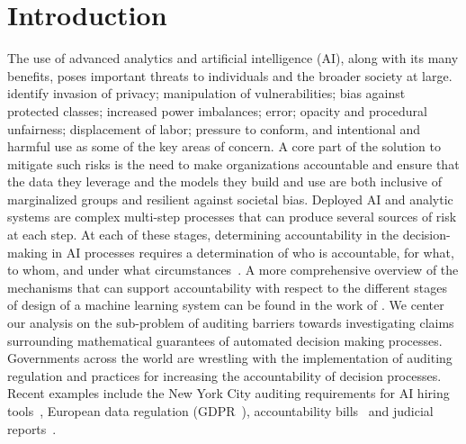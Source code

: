\section{Introduction}



The use of advanced analytics and artificial intelligence (AI), along with its many benefits, poses important threats to individuals and the broader society at large.
\cite{hirsch20corporate} identify invasion of privacy; manipulation of vulnerabilities;  bias against protected classes; increased power imbalances;  error; opacity and procedural unfairness; displacement of labor;  pressure to conform, and intentional and harmful use as some of the key areas of concern.
A core part of the solution %
to mitigate such risks is the need to make organizations accountable and ensure that the data they leverage and the models they build and use 
are both inclusive of marginalized groups and resilient against societal bias.
Deployed AI and analytic systems are complex multi-step processes that can produce several sources of risk at each step.
At each of these stages, determining accountability in the decision-making in AI processes requires a determination of who is accountable, for what, to whom, and under what circumstances~\citep{nissenbaum1996accountability,cooper2022accountability}. 
A more comprehensive overview of the mechanisms that can support accountability with respect to the different stages of design of a machine learning system can be found in the work of \citet{cooper2022accountability}.
We center our analysis on the sub-problem of auditing barriers towards investigating claims surrounding mathematical guarantees of automated decision making processes.
Governments across the world are wrestling with the implementation of auditing regulation and practices for increasing the accountability of decision processes.
Recent examples include the New York City auditing requirements for AI hiring tools~\citep{vanderford2022nybiaslaw}, European data regulation (GDPR~\citeyear{GDPR}), accountability bills~\citeyear{congress2019hr,algtransparency2022} and judicial reports~\citeyear{justice2018free}.
